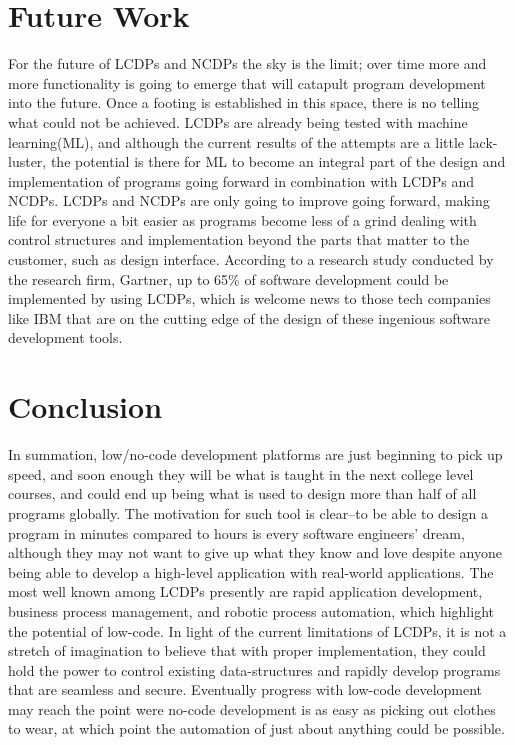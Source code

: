 \documentclass[conference]{IEEEtran}
\begin{document}
\section{Future Work}
For the future of LCDPs and NCDPs the sky is the limit; over time more and more functionality is going to emerge that will catapult program development into the future.  Once a footing is established in this space, there is no telling what could not be achieved. LCDPs are already being tested with machine learning(ML), and although the current results of the attempts are a little lack-luster, the potential is there for ML to become an integral part of the design and implementation of programs going forward in combination with LCDPs and NCDPs\cite{AML}.  LCDPs and NCDPs are only going to improve going forward, making life for everyone a bit easier as programs become less of a grind dealing with control structures and implementation beyond the parts that matter to the customer, such as design interface.  According to a research study conducted by the research firm, Gartner, up to 65\% of software development could be implemented by using LCDPs\cite{XRM}, which is welcome news to those tech companies like IBM that are on the cutting edge of the design of these ingenious software development tools. 
\section{Conclusion}
In summation, low/no-code development platforms are just beginning to pick up speed, and soon enough they will be what is taught in the next college level courses, and could end up being what is used to design more than half of all programs globally.  The motivation for such tool is clear--to be able to design a program in minutes compared to hours is every software engineers' dream, although they may not want to give up what they know and love despite anyone being able to develop a high-level application with real-world applications. The most well known among LCDPs presently are rapid application development, business process management, and robotic process automation, which highlight the potential of low-code.  In light of the current limitations of LCDPs, it is not a stretch of imagination to believe that with proper implementation, they could hold the power to control existing data-structures and rapidly develop programs that are seamless and secure.  Eventually progress with low-code development may reach the point were no-code development is as easy as picking out clothes to wear, at which point the automation of just about anything could be possible. 


\end{document}

